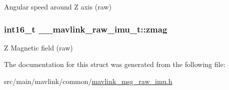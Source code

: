Angular speed around Z axis (raw) 

\hypertarget{struct____mavlink__raw__imu__t_a9c91b2950a80f2598bb7c1ed484cb74a}{
\subsubsection[{zmag}]{\setlength{\rightskip}{0pt plus 5cm}int16\+\_\+t \+\_\+\+\_\+mavlink\+\_\+raw\+\_\+imu\+\_\+t\+::zmag}}\label{struct____mavlink__raw__imu__t_a9c91b2950a80f2598bb7c1ed484cb74a}


Z Magnetic field (raw) 



The documentation for this struct was generated from the following file\+:\begin{DoxyCompactItemize}
\item 
src/main/mavlink/common/\hyperlink{mavlink__msg__raw__imu_8h}{mavlink\+\_\+msg\+\_\+raw\+\_\+imu.\+h}\end{DoxyCompactItemize}
